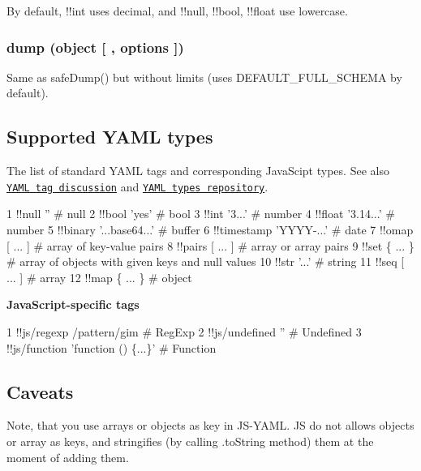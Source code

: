 By default, !!int uses {\ttfamily decimal}, and !!null, !!bool, !!float use {\ttfamily lowercase}.

\subsubsection*{dump (object \mbox{[} , options \mbox{]})}

Same as {\ttfamily safe\+Dump()} but without limits (uses {\ttfamily D\+E\+F\+A\+U\+L\+T\+\_\+\+F\+U\+L\+L\+\_\+\+S\+C\+H\+E\+M\+A} by default).

\subsection*{Supported Y\+A\+M\+L types }

The list of standard Y\+A\+M\+L tags and corresponding Java\+Scipt types. See also \href{http://pyyaml.org/wiki/YAMLTagDiscussion}{\tt Y\+A\+M\+L tag discussion} and \href{http://yaml.org/type/}{\tt Y\+A\+M\+L types repository}.


\begin{DoxyCode}
1 !!null ''                   # null
2 !!bool 'yes'                # bool
3 !!int '3...'                # number
4 !!float '3.14...'           # number
5 !!binary '...base64...'     # buffer
6 !!timestamp 'YYYY-...'      # date
7 !!omap [ ... ]              # array of key-value pairs
8 !!pairs [ ... ]             # array or array pairs
9 !!set \{ ... \}               # array of objects with given keys and null values
10 !!str '...'                 # string
11 !!seq [ ... ]               # array
12 !!map \{ ... \}               # object
\end{DoxyCode}


{\bfseries Java\+Script-\/specific tags}


\begin{DoxyCode}
1 !!js/regexp /pattern/gim            # RegExp
2 !!js/undefined ''                   # Undefined
3 !!js/function 'function () \{...\}'   # Function
\end{DoxyCode}


\subsection*{Caveats }

Note, that you use arrays or objects as key in J\+S-\/\+Y\+A\+M\+L. J\+S do not allows objects or array as keys, and stringifies (by calling .to\+String method) them at the moment of adding them.


